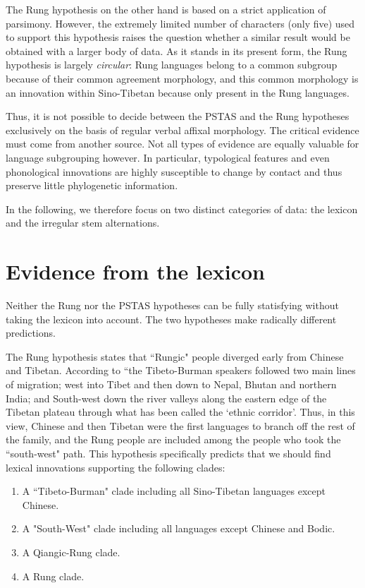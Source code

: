 \documentclass[oldfontcommands,oneside,a4paper,11pt]{article}
\begin{document}
The Rung hypothesis  on the other hand is based on a strict application of parsimony. However, the extremely limited number of characters (only five) used to support this hypothesis raises the question whether a similar result would be obtained with a larger body of data. As it stands in its present form, the Rung hypothesis is largely \textit{circular}: Rung languages belong to a common subgroup because of their common agreement morphology, and this common morphology is an innovation within Sino-Tibetan because only present in the Rung languages. 

Thus, it is not possible to decide between  the PSTAS and the Rung hypotheses exclusively on the basis of regular verbal affixal morphology. The critical evidence must come from another source. Not all types of evidence are equally valuable for language subgrouping however. In particular, typological features and even phonological innovations are highly susceptible to change by contact and thus preserve little phylogenetic information.

In  the following, we therefore focus on two distinct categories of data: the lexicon and the   irregular stem alternations.
 

\section{Evidence from the lexicon}
Neither the Rung   nor the PSTAS hypotheses can be fully statisfying without taking the lexicon into account. The two hypotheses make radically different predictions. 

The Rung hypothesis states that ``Rungic" people diverged early from Chinese and Tibetan. According to \citet[236]{lapolla01migration}  ``the Tibeto-Burman speakers followed two main lines of migration; west into Tibet and then down to Nepal, Bhutan and northern India; and South-west down the river valleys along the eastern edge of the Tibetan plateau through what has been called the `ethnic corridor'. Thus, in this view, Chinese and then Tibetan were the first languages to branch off the rest of the family, and the Rung people are included among the people who took the ``south-west" path. This hypothesis specifically predicts that we should find lexical innovations supporting the following clades:

\begin{enumerate}
\item  A ``Tibeto-Burman" clade including all Sino-Tibetan languages except Chinese.
\item A "South-West" clade including all languages except Chinese and Bodic.
\item A Qiangic-Rung clade.
\item A Rung clade.
\end{enumerate}
\end{document}
